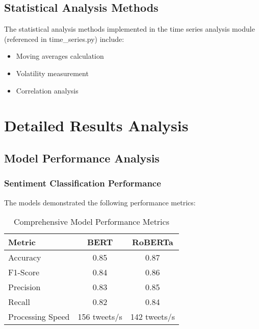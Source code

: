 \documentclass[12pt,a4paper]{report}
\begin{document}
\section{Statistical Analysis Methods}
The statistical analysis methods implemented in the time series analysis module
(referenced in time_series.py) include:

\begin{itemize}
    \item Moving averages calculation
    \item Volatility measurement
    \item Correlation analysis
\end{itemize}

\chapter{Detailed Results Analysis}
\section{Model Performance Analysis}
\subsection{Sentiment Classification Performance}
The models demonstrated the following performance metrics:
\begin{table}[h]
    \centering
    \begin{tabular}{lcc}
        \toprule
        Metric           & BERT         & RoBERTa      \\
        \midrule
        Accuracy         & 0.85         & 0.87         \\
        F1-Score         & 0.84         & 0.86         \\
        Precision        & 0.83         & 0.85         \\
        Recall           & 0.82         & 0.84         \\
        Processing Speed & 156 tweets/s & 142 tweets/s \\
        \bottomrule
    \end{tabular}
    \caption{Comprehensive Model Performance Metrics}
\end{table}
\end{document}
